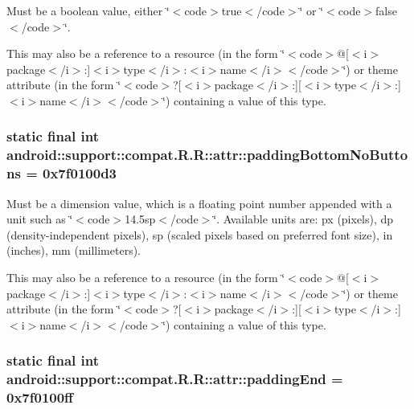 Must be a boolean value, either \char`\"{}$<$code$>$true$<$/code$>$\char`\"{} or \char`\"{}$<$code$>$false$<$/code$>$\char`\"{}. 

This may also be a reference to a resource (in the form \char`\"{}$<$code$>$@\mbox{[}$<$i$>$package$<$/i$>$:\mbox{]}$<$i$>$type$<$/i$>$:$<$i$>$name$<$/i$>$$<$/code$>$\char`\"{}) or theme attribute (in the form \char`\"{}$<$code$>$?\mbox{[}$<$i$>$package$<$/i$>$:\mbox{]}\mbox{[}$<$i$>$type$<$/i$>$:\mbox{]}$<$i$>$name$<$/i$>$$<$/code$>$\char`\"{}) containing a value of this type. \hypertarget{classandroid_1_1support_1_1compat_1_1_r_1_1attr_7a1db432ce545ce9cf15c1342406db7f}{
\subsubsection[{paddingBottomNoButtons}]{\setlength{\rightskip}{0pt plus 5cm}static final int android::support::compat.R.R::attr::paddingBottomNoButtons = 0x7f0100d3}}
\label{classandroid_1_1support_1_1compat_1_1_r_1_1attr_7a1db432ce545ce9cf15c1342406db7f}


Must be a dimension value, which is a floating point number appended with a unit such as \char`\"{}$<$code$>$14.5sp$<$/code$>$\char`\"{}. Available units are: px (pixels), dp (density-independent pixels), sp (scaled pixels based on preferred font size), in (inches), mm (millimeters). 

This may also be a reference to a resource (in the form \char`\"{}$<$code$>$@\mbox{[}$<$i$>$package$<$/i$>$:\mbox{]}$<$i$>$type$<$/i$>$:$<$i$>$name$<$/i$>$$<$/code$>$\char`\"{}) or theme attribute (in the form \char`\"{}$<$code$>$?\mbox{[}$<$i$>$package$<$/i$>$:\mbox{]}\mbox{[}$<$i$>$type$<$/i$>$:\mbox{]}$<$i$>$name$<$/i$>$$<$/code$>$\char`\"{}) containing a value of this type. \hypertarget{classandroid_1_1support_1_1compat_1_1_r_1_1attr_fb56b01e69945f7530d1ab7e9eeda00f}{
\subsubsection[{paddingEnd}]{\setlength{\rightskip}{0pt plus 5cm}static final int android::support::compat.R.R::attr::paddingEnd = 0x7f0100ff}}
\label{classandroid_1_1support_1_1compat_1_1_r_1_1attr_fb56b01e69945f7530d1ab7e9eeda00f}


